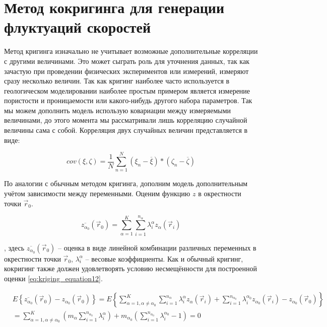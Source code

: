 \section{Метод кокригинга для генерации флуктуаций скоростей} \label{sect1_3}

Метод кригинга изначально не учитывает возможные дополнительные корреляции с другими величинами. Это может сыграть роль для уточнения данных, так как зачастую при проведении физических экспериментов или измерений, измеряют сразу несколько величин. Так как кригинг наиболее часто используется в геологическом моделировании наиболее простым примером является измерение пористости и проницаемости или какого-нибудь другого набора параметров. Так мы можем дополнить модель использую ковариации между измеряемыми величинами, до этого момента мы рассматривали лишь корреляцию случайной величины сама с собой. Корреляция двух случайных величин представляется в виде:

\begin{equation}
  \label{eq:kriging_equation11}
  cov(\xi, \zeta) = \frac{1}{N} \sum_{n = 1}^N (\xi_n - \overline{\xi}) * (\zeta_n - \overline{\zeta})
\end{equation}

По аналогии с обычным методом кригинга, дополним модель дополнительным учётом зависимости между переменными. Оценим функцию $z$ в окрестности точки $\vec r_0$.  

\begin{equation}
  \label{eq:kriging_equation12}
  \overline{z_{\alpha_0}} (\vec r_0) = \sum_{\alpha = 1}^K \sum_{i = 1}^{n_\alpha} \lambda_{i}^{\alpha} z_{\alpha}(\vec r_i)
\end{equation}

, здесь $\overline{z_{\alpha_0}} (\vec r_0)$ -- оценка в виде линейной комбинации различных переменных в окрестности точки $\vec r_0$, $\lambda_{i}^{\alpha}$ -- весовые коэффициенты. Как и обычный кригинг, кокригинг также должен удовлетворять условию несмещённости для построенной оценки \eqref{eq:kriging_equation12}.

\begin{align}
    & E \left\{ \overline{z_{\alpha_0}} (\vec r_0) - z_{\alpha_0} (\vec r_0) \right\} = E \left\{ \sum_{\alpha = 1, \alpha \neq \alpha_0}^K \sum_{i = 1}^{n_\alpha} \lambda_{i}^{\alpha} z_{\alpha}(\vec r_i) + \sum_{i = 1}^{n_{\alpha_0}} \lambda_i^{\alpha_0} z_{\alpha_0} (\vec r_i) - z_{\alpha_0} (\vec r_0) \right\} \nonumber \\
    & = \sum_{\alpha = 1, \alpha \neq \alpha_0} ^ K \left( m_\alpha \sum_{i = 1}^{n_{\alpha_0}} \lambda_i^\alpha \right)
    + m_{\alpha_0} \left( \sum_{i = 1}^{n_{\alpha_0}} \lambda_i^{\alpha_0} - 1 \right) = 0
\end{align}


